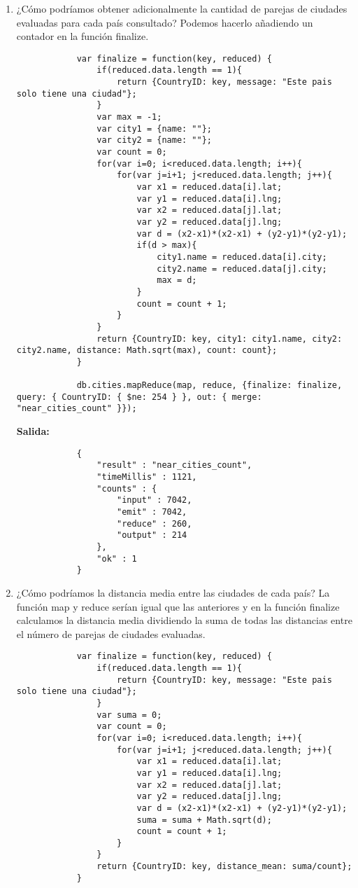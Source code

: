 \begin{enumerate}
	\item ¿Cómo podríamos obtener adicionalmente la cantidad de parejas de ciudades evaluadas para cada país consultado?
		Podemos hacerlo añadiendo un contador en la función finalize.
		\begin{lstlisting}
			var finalize = function(key, reduced) {
				if(reduced.data.length == 1){
					return {CountryID: key, message: "Este pais solo tiene una ciudad"};
				}
				var max = -1;
				var city1 = {name: ""};
				var city2 = {name: ""};
				var count = 0;
				for(var i=0; i<reduced.data.length; i++){
					for(var j=i+1; j<reduced.data.length; j++){
						var x1 = reduced.data[i].lat;
						var y1 = reduced.data[i].lng;
						var x2 = reduced.data[j].lat;
						var y2 = reduced.data[j].lng;
						var d = (x2-x1)*(x2-x1) + (y2-y1)*(y2-y1);
						if(d > max){
							city1.name = reduced.data[i].city;
							city2.name = reduced.data[j].city;
							max = d;
						}
						count = count + 1;
					}
				}
				return {CountryID: key, city1: city1.name, city2: city2.name, distance: Math.sqrt(max), count: count};
			}

			db.cities.mapReduce(map, reduce, {finalize: finalize, query: { CountryID: { $ne: 254 } }, out: { merge: "near_cities_count" }});
		\end{lstlisting}
		\textbf{Salida:}
		\begin{lstlisting}
			{
				"result" : "near_cities_count",
				"timeMillis" : 1121,
				"counts" : {
					"input" : 7042,
					"emit" : 7042,
					"reduce" : 260,
					"output" : 214
				},
				"ok" : 1
			}
		\end{lstlisting}
		
	\item ¿Cómo podríamos la distancia media entre las ciudades de cada país?
		La función map y reduce serían igual que las anteriores y en la función finalize calculamos la distancia media dividiendo la suma de todas las distancias entre el número de parejas de ciudades evaluadas.
		\begin{lstlisting}
			var finalize = function(key, reduced) {
				if(reduced.data.length == 1){
					return {CountryID: key, message: "Este pais solo tiene una ciudad"};
				}
				var suma = 0;
				var count = 0;
				for(var i=0; i<reduced.data.length; i++){
					for(var j=i+1; j<reduced.data.length; j++){
						var x1 = reduced.data[i].lat;
						var y1 = reduced.data[i].lng;
						var x2 = reduced.data[j].lat;
						var y2 = reduced.data[j].lng;
						var d = (x2-x1)*(x2-x1) + (y2-y1)*(y2-y1);
						suma = suma + Math.sqrt(d);
						count = count + 1;
					}
				}
				return {CountryID: key, distance_mean: suma/count};
			}
			

\end{lstlisting}
\end{enumerate}
